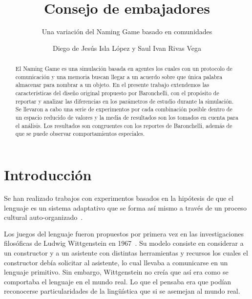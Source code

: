 \documentclass[runningheads]{llncs}
\begin{document}
%
\title{Consejo de embajadores}
\subtitle{Una variación del Naming Game basado en comunidades}
%
%
\author{Diego de Jesús Isla López y
Saul Ivan Rivas Vega}
%
%
%
\maketitle              %
%
\begin{abstract}
El Naming Game es una simulación basada en agentes los cuales con un protocolo de comunicación y una memoria buscan llegar a un acuerdo sobre que única palabra almacenar para nombrar a un objeto. En el presente trabajo extendemos las características del diseño original propuesto por Baronchelli, con el propósito de reportar y analizar las diferencias en los parámetros de estudio durante la simulación. Se llevaron a cabo una serie de experimentos por cada combinación posible dentro de un espacio reducido de valores y la media de resultados son los tomados en cuenta para el análisis. Los resultados son congruentes con los reportes de Baronchelli, además de que se puede observar comportamientos especiales.
\end{abstract}
%
%
%
\section {Introducción}
Se han realizado trabajos con experimentos basados en la hipótesis de que el lenguaje es un sistema adaptativo que se forma así mismo a través de un proceso cultural auto-organizado~\cite{Baronchelli_2006}.

Los juegos del lenguaje fueron propuestos por primera vez en las investigaciones filosóficas de Ludwig Wittgenstein en 1967~\cite{as474369}. Su modelo consiste en considerar a un constructor y a un asistente con distintas herramientas y recursos los cuales el constructor debía solicitar al asistente, lo cual llevaba a comunicarse en un lenguaje primitivo. Sin embargo, Wittgenstein no creía que así era como se comportaba el lenguaje en el mundo real. Lo que el pensaba era que podían reconocerse particularidades de la lingüística que si se asemejan al mundo real.
\end{document}
